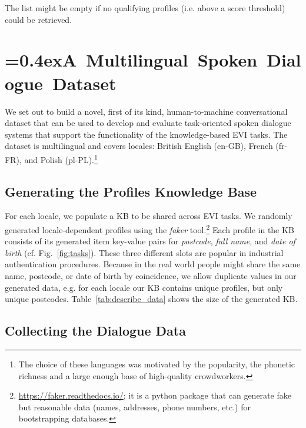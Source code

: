 \documentclass[11pt]{article}
\begin{document}
{The list might be empty if no qualifying profiles (i.e. above a score threshold) could be retrieved.

 

\section{{\font=0.4ex{A~Multilingual~Spoken~Dialogue~Dataset}}}
\label{sec:data}

We set out to build a novel, first of its kind, human-to-machine conversational dataset that can be used to develop and evaluate task-oriented spoken dialogue systems that support the functionality of the knowledge-based EVI tasks. The dataset is multilingual and covers  locales: British English (en-GB), French (fr-FR), and Polish (pl-PL).\footnote{The choice of these languages was motivated by the popularity, the phonetic richness and a large enough base of high-quality crowdworkers.}

\subsection{Generating the Profiles Knowledge Base} \label{sec:kb-generation}

For each locale, we populate a KB to be shared across EVI tasks.
We randomly generated locale-dependent profiles using the \textit{faker} tool.\footnote{\url{https://faker.readthedocs.io/}; it is a python package that can generate fake but reasonable data (names, addresses, phone numbers, etc.) for bootstrapping databases.} Each profile in the KB consists of its generated item key-value pairs for \textit{postcode}, \textit{full name}, and \textit{date of birth} (cf. Fig.~\ref{fig:tasks}). These three different slots are popular in industrial authentication procedures. Because in the real world people might share the same
name, postcode, or date of birth by coincidence,
we allow duplicate values in our generated data,
e.g. for each locale our KB contains  unique profiles,
but only  unique postcodes. Table~\ref{tab:describe_data} shows the size of the generated KB.


\subsection{Collecting the Dialogue Data}
\label{sec:data-collection}

}
\end{document}
